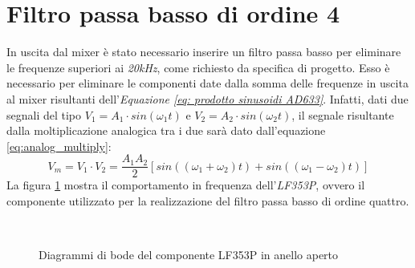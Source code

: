 \documentclass[titlepage]{report}
\begin{document}
	\label{ch:Risultati}
	
\newpage
\section{Filtro passa basso di ordine 4}
	In uscita dal mixer è stato necessario inserire un filtro passa basso per eliminare le frequenze superiori ai \textit{20kHz}, come richiesto da specifica di progetto. Esso è necessario per eliminare le componenti date dalla somma delle frequenze in uscita al mixer risultanti dell'\textit{Equazione \ref{eq: prodotto sinusoidi AD633}}. Infatti, dati due segnali del tipo $ V_1 = A_1 \cdot sin(\omega_1t) $
	e $ V_2 = A_2 \cdot sin(\omega_2t) $, il segnale risultante dalla moltiplicazione analogica tra i due sarà dato dall'equazione \ref{eq:analog_multiply}:
	\begin{equation}
		V_m = V_1 \cdot V_2 = \frac{A_1A_2}{2}[sin((\omega_1 + \omega_2)t) + sin((\omega_1 - \omega_2)t)]
		\label{eq:analog_multiply}
	\end{equation}
	La figura \ref{fig:bode_LF353P} mostra il comportamento in frequenza dell'\textit{LF353P}, ovvero il componente utilizzato per la realizzazione del filtro passa basso di ordine quattro.

	\begin{figure}[h]
		\centering
		 \qquad
		 \\
		\caption{Diagrammi di bode del componente LF353P in anello aperto}
		\label{fig:bode_LF353P}
	\end{figure}
\end{document}
